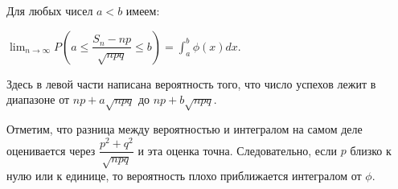 \documentclass[a4paper]{article}
\begin{document}
\begin{colloq}
	\begin{theorem}
		Для любых чисел $a < b$ имеем:
		
		$\lim_{n \rightarrow \infty} P\left( a \leqslant \dfrac{S_n - np}{\sqrt{npq}} \leqslant b \right) = \int_a^b \phi(x) dx$.
		
		Здесь в левой части написана вероятность того, что число успехов лежит в диапазоне от $np + a\sqrt{npq}$ до $np + b\sqrt{npq}$.
	\end{theorem}

	Отметим, что разница между вероятностью и интегралом на самом деле оценивается через $\dfrac{p^2 + q^2}{\sqrt{npq}}$ и эта оценка точна. Следовательно, если $p$ близко к нулю или к единице, то	вероятность плохо приближается интегралом от $\phi$.

    \end{colloq}
\end{document}
